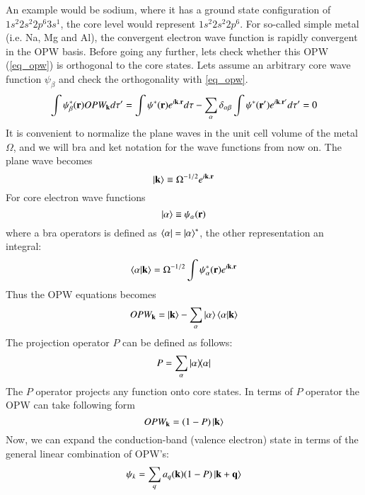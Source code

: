 An example would be sodium, where it has a ground state configuration of $1s^2 2s^2 2p^6 3s^1$, the core level would represent $1s^2 2s^2 2p^6$. For so-called simple metal (i.e. Na, Mg and Al), the convergent electron wave function is rapidly convergent in the OPW basis. Before going any further, lets check whether this OPW (\ref{eq_opw}) is orthogonal to the core states. Lets assume an arbitrary core wave function $\psi_{\beta}$ and check the orthogonality with \ref{eq_opw}.
\begin{equation}
\int\psi^{\ast}_{\beta}(\vb{r})OPW_{\vb{k}}d\tau' = \int \psi^{\ast} (\vb{r}) e^{i\vb{k.r}} d\tau - \sum_{\alpha} \delta_{\alpha\beta} \int \psi^{\ast} (\vb{r'}) e^{i\vb{k.r'}} d\tau' = 0 
\end{equation}
It is convenient to normalize the plane waves in the unit cell volume of the metal $\Omega$, and we will bra and ket notation for the wave functions from now on. The plane wave becomes
\begin{equation}
	\ket{\vb{k}} \equiv \Omega^{-1/2}e^{i\vb{k.r}}
\end{equation}
For core electron wave functions
\begin{equation}
	\ket{\alpha} \equiv \psi_{\alpha} (\vb{r}) 
\end{equation}
where a bra operators is defined as $\bra{\alpha} = \ket{\alpha}^{\ast}$, the other representation an integral:
\begin{equation}
	\braket{\alpha}{\vb{k}} = \Omega^{-1/2} \int \psi^{\ast}_{\alpha} (\vb{r}) e^{i\vb{k.r}}
\end{equation}
Thus the OPW equations becomes
\begin{equation}
	OPW_{\vb{k}} = \ket{\vb{k}} - \sum_{\alpha} \ket{\alpha}\braket{\alpha}{\vb{k}}
\end{equation}
The projection operator $P$ can be defined as follows:
\begin{equation}
\label{eq_proj}
P = \sum_{\alpha} \dyad{\alpha}{\alpha}
\end{equation}
The $P$ operator projects any function onto core states. In terms of $P$ operator the OPW can take following form
\begin{equation}
	OPW_{\vb{k}} = (1-P)\ket{\vb{k}}
\end{equation}
Now, we can expand the conduction-band (valence electron) state in terms of the general linear combination of  OPW's:
\begin{equation}
	\psi_{k} = \sum_q a_q (\vb{k})(1-P)\ket{\vb{k}+\vb{q}}
\end{equation}
